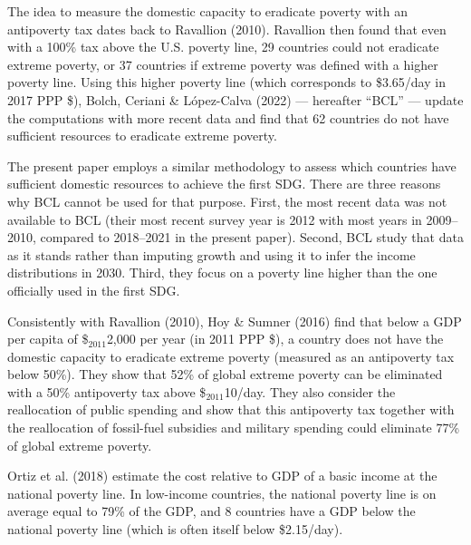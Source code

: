 The idea to measure the domestic capacity to eradicate poverty with an antipoverty tax dates back to Ravallion (2010).\cite{ravallion_poorer_2010} Ravallion then found that even with a 100\% tax above the U.S. poverty line, 29 countries could not eradicate extreme poverty, or 37 countries if extreme poverty was defined with a higher poverty line. Using this higher poverty line (which corresponds to \$3.65/day in 2017 PPP \$), Bolch, Ceriani \& López-Calva (2022) --- hereafter ``BCL'' --- update the computations with more recent data and find that 62 countries do not have sufficient resources to eradicate extreme poverty.\cite{bolch_arithmetics_2022} %

The present paper employs a similar methodology to assess which countries have sufficient domestic resources to achieve the first SDG. There are three reasons why BCL cannot be used %
for that purpose. 
First, the most recent data was not available to BCL (their most recent survey year is 2012 with most years in 2009--2010, compared to 2018--2021 in the present paper). Second, BCL study that data as it stands rather than imputing growth and using it to infer the income distributions in 2030. Third, they focus on a poverty line higher than the one officially used in the first SDG.

Consistently with Ravallion (2010), Hoy \& Sumner (2016) find that below a GDP per capita of \$$_\text{2011}$2,000 per year (in 2011 PPP \$), a country does not have the domestic capacity to eradicate extreme poverty (measured as an antipoverty tax below 50\%).\cite{hoy_gasoline_2016} 
They show that 52\% of global extreme poverty can be eliminated with a 50\% antipoverty tax above \$$_\text{2011}$10/day. They also consider the reallocation of public spending and show that this antipoverty tax together with the reallocation of fossil-fuel subsidies and military spending could eliminate 77\% of global extreme poverty. 

Ortiz et al. (2018) estimate the cost relative to GDP of a basic income at the national poverty line. In low-income countries, the national poverty line is on average equal to 79\% of the GDP, and 8 countries have a GDP below the national poverty line (which is often itself below \$2.15/day).\cite{ortiz}

